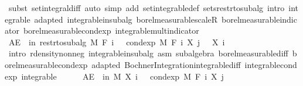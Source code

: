 \begin{isabellebody}
\ {\isacharparenleft}{\kern0pt}subst\ set{\isacharunderscore}{\kern0pt}integral{\isacharunderscore}{\kern0pt}diff{\isacharcomma}{\kern0pt}\ auto\ simp\ add{\isacharcolon}{\kern0pt}\ set{\isacharunderscore}{\kern0pt}integrable{\isacharunderscore}{\kern0pt}def\ sets{\isacharunderscore}{\kern0pt}restr{\isacharunderscore}{\kern0pt}to{\isacharunderscore}{\kern0pt}subalg\ intro{\isacharbang}{\kern0pt}{\isacharcolon}{\kern0pt}\ integrable\ adapted\ integrable{\isacharunderscore}{\kern0pt}in{\isacharunderscore}{\kern0pt}subalg\ borel{\isacharunderscore}{\kern0pt}measurable{\isacharunderscore}{\kern0pt}scaleR\ borel{\isacharunderscore}{\kern0pt}measurable{\isacharunderscore}{\kern0pt}indicator\ borel{\isacharunderscore}{\kern0pt}measurable{\isacharunderscore}{\kern0pt}cond{\isacharunderscore}{\kern0pt}exp\ integrable{\isacharunderscore}{\kern0pt}mult{\isacharunderscore}{\kern0pt}indicator{\isacharparenright}{\kern0pt}\isanewline
\ \ \ \ \isacommand{{\isacharbraceright}{\kern0pt}}\isamarkupfalse%
\isanewline
\ \ \ \ \isamarkupfalse%
\ {\isachardoublequoteopen}AE\ {\isasymxi}\ in\ restr{\isacharunderscore}{\kern0pt}to{\isacharunderscore}{\kern0pt}subalg\ M\ {\isacharparenleft}{\kern0pt}F\ i{\isacharparenright}{\kern0pt}{\isachardot}{\kern0pt}\ {}\ {\isasymle}\ cond{\isacharunderscore}{\kern0pt}exp\ M\ {\isacharparenleft}{\kern0pt}F\ i{\isacharparenright}{\kern0pt}\ {\isacharparenleft}{\kern0pt}X\ j{\isacharparenright}{\kern0pt}\ {\isasymxi}\ {\isacharminus}{\kern0pt}\ X\ i\ {\isasymxi}{\isachardoublequoteclose}\ \isanewline
\ \ \ \ \ \ \isamarkupfalse%
\ {\isacharparenleft}{\kern0pt}intro\ r{\isachardot}{\kern0pt}density{\isacharunderscore}{\kern0pt}nonneg\ integrable{\isacharunderscore}{\kern0pt}in{\isacharunderscore}{\kern0pt}subalg\ asm\ subalgebra\ borel{\isacharunderscore}{\kern0pt}measurable{\isacharunderscore}{\kern0pt}diff\ borel{\isacharunderscore}{\kern0pt}measurable{\isacharunderscore}{\kern0pt}cond{\isacharunderscore}{\kern0pt}exp\ adapted\ Bochner{\isacharunderscore}{\kern0pt}Integration{\isachardot}{\kern0pt}integrable{\isacharunderscore}{\kern0pt}diff\ integrable{\isacharunderscore}{\kern0pt}cond{\isacharunderscore}{\kern0pt}exp\ integrable{\isacharparenright}{\kern0pt}\isanewline
\ \ \ \ \isamarkupfalse%
\ {\isachardoublequoteopen}AE\ {\isasymxi}\ in\ M{\isachardot}{\kern0pt}\ X\ i\ {\isasymxi}\ {\isasymle}\ cond{\isacharunderscore}{\kern0pt}exp\ M\ {\isacharparenleft}{\kern0pt}F\ i{\isacharparenright}{\kern0pt}\ {\isacharparenleft}{\kern0pt}X\ j{\isacharparenright}{\kern0pt}\ {\isasymxi}{\isachardoublequoteclose}\ \isamarkupfalse%

\end{isabellebody}
